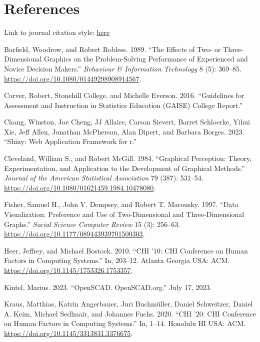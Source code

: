 \documentclass[
  12pt,
]{article}
\newlength{\cslhangindent}
\newenvironment{CSLReferences}[2] %
 {\begin{list}{}{%
  \setlength{\itemindent}{0pt}
  \setlength{\leftmargin}{0pt}
  \setlength{\parsep}{0pt}
  \ifodd #1
   \setlength{\leftmargin}{\cslhangindent}
   \setlength{\itemindent}{-1\cslhangindent}
  \fi
  \setlength{\itemsep}{#2\baselineskip}}}
 {\end{list}}
\begin{document}
\section{References}\label{references}

Link to journal citation style:
\href{https://www.tandfonline.com/action/authorSubmission?show=instructions&journalCode=ujse21\#refs}{here}

\label{refs}
\begin{CSLReferences}{1}{0}
Barfield, Woodrow, and Robert Robless. 1989. {``The Effects of Two- or
Three-Dimensional Graphics on the Problem-Solving Performance of
Experienced and Novice Decision Makers.''} \emph{Behaviour \&
Information Technology} 8 (5): 369--85.
\url{https://doi.org/10.1080/01449298908914567}.

Carver, Robert, Stonehill College, and Michelle Everson. 2016.
{``Guidelines for Assessment and Instruction in Statistics Education
(GAISE) College Report.''}

Chang, Winston, Joe Cheng, JJ Allaire, Carson Sievert, Barret Schloerke,
Yihui Xie, Jeff Allen, Jonathan McPherson, Alan Dipert, and Barbara
Borges. 2023. {``Shiny: Web Application Framework for r.''}

Cleveland, William S., and Robert McGill. 1984. {``Graphical Perception:
Theory, Experimentation, and Application to the Development of Graphical
Methods.''} \emph{Journal of the American Statistical Association} 79
(387): 531--54. \url{https://doi.org/10.1080/01621459.1984.10478080}.

Fisher, Samuel H., John V. Dempsey, and Robert T. Marousky. 1997.
{``Data Visualization: Preference and Use of Two-Dimensional and
Three-Dimensional Graphs.''} \emph{Social Science Computer Review} 15
(3): 256--63. \url{https://doi.org/10.1177/089443939701500303}.

Heer, Jeffrey, and Michael Bostock. 2010. {``CHI '10: CHI Conference on
Human Factors in Computing Systems.''} In, 203--12. Atlanta Georgia USA:
ACM. \url{https://doi.org/10.1145/1753326.1753357}.

Kintel, Marius. 2023. {``{OpenSCAD}. {OpenSCAD}.org.''} July 17, 2023.

Kraus, Matthias, Katrin Angerbauer, Juri Buchmüller, Daniel Schweitzer,
Daniel A. Keim, Michael Sedlmair, and Johannes Fuchs. 2020. {``CHI '20:
CHI Conference on Human Factors in Computing Systems.''} In, 1--14.
Honolulu HI USA: ACM. \url{https://doi.org/10.1145/3313831.3376675}.


\end{CSLReferences}
\end{document}
